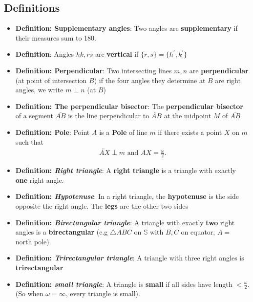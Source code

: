 \documentclass{report}
\begin{document}
    \subsection{Definitions}
    \begin{itemize}
        \item \textbf{Definition: Supplementary angles}: Two angles are \textbf{supplementary} if their measures sum to 180.
        \item \textbf{Definition}: Angles $\underline{hk}, \underline{rs}$ are \textbf{vertical} if $\{r,s\}  = \{h^{\prime}, k^{\prime}\}$
        \item \textbf{Definition: Perpendicular}: Two intersecting lines $m,n$ are \textbf{perpendicular} (at point of intersection $B$) if the four angles they determine at $B$ are right angles, we write $m\perp n$ (at $B$)
        \item \textbf{Definition: The perpendicular bisector}: The \textbf{perpendicular bisector} of a segment $\overline{AB}$ is the line perpendicular to $\overleftrightarrow{AB}$ at the midpoint $M$ of $\overline{AB}$
        \item \textbf{Definition: Pole}: Point $A$ is a \textbf{Pole} of line $m$ if there exists a point $X$ on $m$ such that 
            \begin{align*}
                \overleftrightarrow{AX} \perp m \text{ and } AX = \frac{\omega}{2}
            .\end{align*}
        \item \textbf{Definition: \textit{Right triangle}}: A \textbf{right triangle} is a triangle with exactly \textbf{one} right angle.
        \item \textbf{Definition: \textit{Hypotenuse}}: In a right triangle, the \textbf{hypotenuse} is the side opposite the right angle. The \textbf{legs} are the other two sides
        \item \textbf{Definition: \textit{Birectangular triangle}}: A triangle with exactly \textbf{two} right angles is a \textbf{birectangular} (e.g $\triangle ABC$ on $\mathbb{S}$ with $B,C$ on equator, $A = $ north pole). 
        \item \textbf{Definition: \textit{Trirectangular triangle}}: A triangle with three right angles is \textbf{trirectangular}
        \item \textbf{Definition: \textit{small triangle}}: A triangle is \textbf{small} if all sides have length $< \frac{\omega}{2}$. (So when $\omega = \infty$, every triangle is small).
            \bigbreak \noindent 

\end{itemize}
\end{document}
